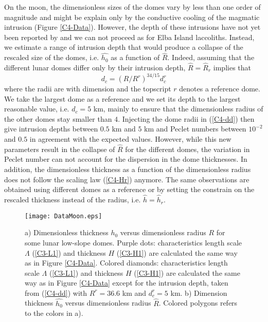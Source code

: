 On the  moon, the dimensionless sizes  of the domes vary  by less than
one order  of magnitude and  might be  explain only by  the conductive
cooling of the magmatic intrusion (Figure \ref{C4-Data}). However, the
depth   of  these   intrusions   have  not   yet   been  reported   by
\citet{Wohler:2009jj}  and  we can  not  proceed  as for  Elba  Island
laccoliths. Instead, we estimate a range of intrusion depth that would
produce a collapse of the rescaled size of the domes, i.e. $\hat{h_0}$
as a function of $\hat{R}$.  Indeed, assuming that the different lunar
domes  differ  only  by  their  intrusion  depth,  $\hat{R}=\hat{R}_r$
implies that
\begin{equation}
  d_c = \left(R/R^r\right)^{34/15}d_c^r
  \label{C4-dd}
\end{equation}
where the  radii are with  dimension and  the topscript $r$  denotes a
reference dome. We take the largest dome as a reference and we set its
depth to  the largest  reasonable value, i.e.   $d_c=5$ km,  mainly to
ensure that the  dimensionless radius of the other  domes stay smaller
than  $4$.   Injecting  the  dome radii  in  (\ref{C4-dd})  then  give
intrusion  depths between  $0.5$  km  and $5$  km  and Peclet  numbers
between   $10^{-2}$  and   $0.5$  in   agreement  with   the  expected
values. However, while  this new parameters result in  the collapse of
$\hat{R}$ for the different domes,  the variation in Peclet number can
not account for the dispersion  in the dome thicknesses.  In addition,
the dimensionless thickness as a  function of the dimensionless radius
does  not follow  the  scaling law  (\ref{C4-Hr})  anymore.  The  same
observations are obtained  using different domes as a  reference or by
setting the constrain on the rescaled thickness instead of the radius,
i.e. $\hat{h}=\hat{h}_r$.

\begin{figure}[h!]
  \begin{center}
    \graphicspath{ {/Users/thorey/Documents/These/Projet/Refroidissement/Skin_Model/Figure/Figure_Heating/} }
    \texttt{[image: DataMoon.eps]}
    \caption{  a) Dimensionless  thickness $h_0$  versus dimensionless
      radius  $R$  for  some  lunar  low-slope  domes.   Purple  dots:
      characteristics   length  scale   $\Lambda$  (\ref{C3-L1})   and
      thickness $H$  (\ref{C3-H1}) are calculated  the same way  as in
      Figure \ref{C4-Data}.  Colored  diamonds: characteristics length
      scale  $\Lambda$ (\ref{C3-L1})  and thickness  $H$ (\ref{C3-H1})
      are calculated  the same way  as in Figure  \ref{C4-Data} except
      for  the   intrusion  depth,   taken  from   (\ref{C4-dd})  with
      $R^r  =  36.6$ km  and  $d_c^r=5$  km.  b)  Dimension  thickness
      $\hat{h_0}$  versus  dimensionless  radius  $\hat{R}$.   Colored
      polygons refers to the colors in a).}
    \label{C4-ArrestMoon}
  \end{center}
\end{figure}




